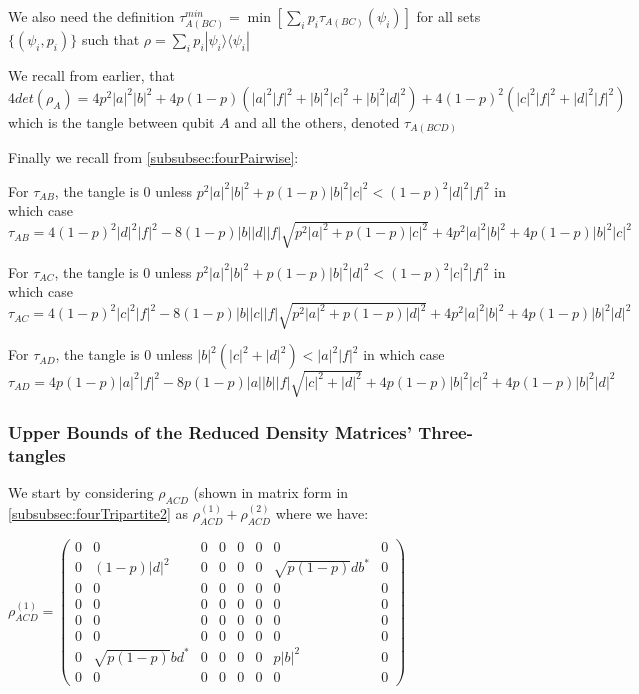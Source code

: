 \documentclass[12pt,a4paper]{article}
\numberwithin{equation}{section}
\begin{document}
We also need the definition $\tau_{A(BC)}^{min} = \min[\sum_{i}p_{i}\tau_{A(BC)}(\psi_{i})]$ for all sets $\{(\psi_{i},p_{i})\}$ such that $\rho = \sum_{i}p_{i}|\psi_{i}\rangle\langle\psi_{i}|$

\vskip 2mm

We recall from earlier, that $4det(\rho_{A}) = 4p^2|a|^2|b|^2 + 4p(1-p)(|a|^2|f|^2+|b|^2|c|^2+|b|^2|d|^2) + 4(1-p)^2(|c|^2|f|^2+|d|^2|f|^2)$ which is the tangle between qubit $A$ and all the others, denoted $\tau_{A(BCD)}$

Finally we recall from \ref{subsubsec:fourPairwise}:

For $\tau_{AB}$, the tangle is $0$ unless $p^2|a|^2|b|^2 + p(1-p)|b|^2|c|^2 < (1-p)^2|d|^2|f|^2$ in which case $\tau_{AB} = 4(1-p)^2|d|^2|f|^2 - 8(1-p)|b||d||f|\sqrt{p^2|a|^2 + p(1-p)|c|^2} +4p^2|a|^2|b|^2 + 4p(1-p)|b|^2|c|^2$

\vskip 2mm

For $\tau_{AC}$, the tangle is $0$ unless $p^2|a|^2|b|^2 + p(1-p)|b|^2|d|^2 < (1-p)^2|c|^2|f|^2$ in which case $\tau_{AC} = 4(1-p)^2|c|^2|f|^2 - 8(1-p)|b||c||f|\sqrt{p^2|a|^2 + p(1-p)|d|^2} +4p^2|a|^2|b|^2 + 4p(1-p)|b|^2|d|^2$

\vskip 2mm

For $\tau_{AD}$, the tangle is $0$ unless $|b|^2(|c|^2 + |d|^2) < |a|^2|f|^2$ in which case $\tau_{AD} = 4p(1-p)|a|^2|f|^2 - 8p(1-p)|a||b||f|\sqrt{|c|^2 + |d|^2} + 4p(1-p)|b|^2|c|^2 + 4p(1-p)|b|^2|d|^2$

\newpage

\subsubsection{Upper Bounds of the Reduced Density Matrices' Three-tangles}
\label{subsubsec:upperBound}

We start by considering $\rho_{ACD}$ (shown in matrix form in \ref{subsubsec:fourTripartite2} as $\rho_{ACD}^{(1)} + \rho_{ACD}^{(2)}$ where we have:

\vskip 2mm

\noindent $\rho_{ACD}^{(1)} = \begin{pmatrix} 0 & 0 & 0 & 0 & 0 & 0 & 0 & 0 \\ 0 & (1-p)|d|^2 & 0 & 0 & 0 & 0 & \sqrt{p(1-p)}db^* & 0 \\ 0 & 0 & 0 & 0 & 0 & 0 & 0 & 0 \\ 0 & 0 & 0 & 0 & 0 & 0 & 0 & 0 \\ 0 & 0 & 0 & 0 & 0 & 0 & 0 & 0 \\ 0 & 0 & 0 & 0 & 0 & 0 & 0 & 0 \\ 0 & \sqrt{p(1-p)}bd^* & 0 & 0 & 0 & 0 & p|b|^2 & 0 \\ 0 & 0 & 0 & 0 & 0 & 0 & 0 & 0 \end{pmatrix}$
\end{document}

